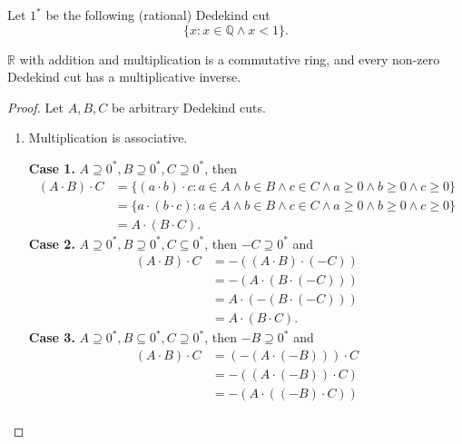 Let ${1}^{*}$ be the following (rational) Dedekind cut
\[
    \{ x: x\in\mathbb{Q}\land x < 1 \}.
\]

\begin{theorem}
    $\mathbb{R}$ with addition and multiplication is a commutative ring, and every non-zero Dedekind cut has a multiplicative inverse.
\end{theorem}

\begin{proof}
    \par Let $A, B, C$ be arbitrary Dedekind cuts.
    \begin{enumerate}[label={(F\arabic*)}, start=4]
        \item Multiplication is associative.

              \textbf{Case 1.} $A\supseteq {0}^{*}, B\supseteq {0}^{*}, C\supseteq {0}^{*}$, then
              \begin{align*}
                  (A\cdot B)\cdot C & = \{ (a\cdot b)\cdot c : a\in A\land b\in B\land c\in C\land a\ge 0\land b\ge 0\land c\ge 0 \} \\
                                    & = \{ a\cdot (b\cdot c) : a\in A\land b\in B\land c\in C\land a\ge 0\land b\ge 0\land c\ge 0 \} \\
                                    & = A\cdot (B\cdot C).
              \end{align*}
              \textbf{Case 2.} $A\supseteq {0}^{*}, B\supseteq {0}^{*}, C\subseteq {0}^{*}$, then $-C\supseteq {0}^{*}$ and
              \begin{align*}
                  (A\cdot B)\cdot C & = -\left( (A\cdot B)\cdot (-C) \right)  \\
                                    & = -\left( A\cdot (B \cdot (-C)) \right) \\
                                    & = A\cdot (-(B\cdot (-C)))               \\
                                    & = A\cdot (B\cdot C).
              \end{align*}
              \textbf{Case 3.} $A\supseteq {0}^{*}, B\subseteq {0}^{*}, C\supseteq {0}^{*}$, then $-B\supseteq {0}^{*}$ and
              \begin{align*}
                  (A\cdot B)\cdot C & = (-(A\cdot (-B)))\cdot C \\
                                    & = -((A\cdot (-B))\cdot C) \\
                                    & = -(A\cdot ((-B)\cdot C)) \\

\end{align*}
\end{enumerate}
\end{proof}
